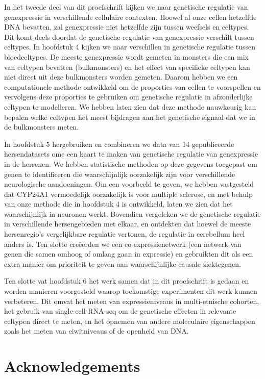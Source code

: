 \begin{appendices}
In het tweede deel van dit proefschrift kijken we naar genetische regulatie van genexpressie in verschillende cellulaire contexten. Hoewel al onze cellen hetzelfde DNA bevatten, zal genexpressie niet hetzelfde zijn tussen weefsels en celtypes. Dit komt deels doordat de genetische regulatie van genexpressie verschilt tussen celtypes. In hoofdstuk 4 kijken we naar verschillen in genetische regulatie tussen bloedceltypes. De meeste genexpressie wordt gemeten in monsters die een mix van celtypen bevatten (bulkmonsters) en het effect van specifieke celtypen kan niet direct uit deze bulkmonsters worden gemeten. Daarom hebben we een computationele methode ontwikkeld om de proporties van cellen te voorspellen en vervolgens deze proporties te gebruiken om genetische regulatie in afzonderlijke celtypen te modelleren. We hebben laten zien dat deze methode nauwkeurig kan bepalen welke celtypen het meest bijdragen aan het genetische signaal dat we in de bulkmonsters meten.

In hoofdstuk 5 hergebruiken en combineren we data van 14 gepubliceerde hersendatasets ome een kaart te maken van genetische regulatie van genexpressie in de hersenen. We hebben statistische methoden op deze gegevens toegepast om genen te identificeren die waarschijnlijk oorzakelijk zijn voor verschillende neurologische aandoeningen. Om een voorbeeld te geven, we hebben vastgesteld dat CYP24A1 vermoedelijk oorzakelijk is voor multiple sclerose, en met behulp van onze methode die in hoofdstuk 4 is ontwikkeld, laten we zien dat het waarschijnlijk in neuronen werkt. Bovendien vergeleken we de genetische regulatie in verschillende hersengebieden met elkaar, en ontdekten dat hoewel de meeste hersenregio's vergelijkbare regulatie vertonen, de regulatie in cerebellum heel anders is. Ten slotte creëerden we een co-expressienetwerk (een netwerk van genen die samen omhoog of omlaag gaan in expressie) en gebruikten dit als een extra manier om prioriteit te geven aan waarschijnlijke causale ziektegenen.

Ten slotte vat hoofdstuk 6 het werk samen dat in dit proefschrift is gedaan en worden manieren voorgesteld waarop toekomstige experimenten dit werk kunnen verbeteren. Dit omvat het meten van expressieniveaus in multi-etnische cohorten, het gebruik van single-cell RNA-seq om de genetische effecten in relevante celtypen direct te meten, en het opnemen van andere moleculaire eigenschappen zoals het meten van eiwitniveaus of de openheid van DNA. 

\chapter{Acknowledgements}


\end{appendices}
